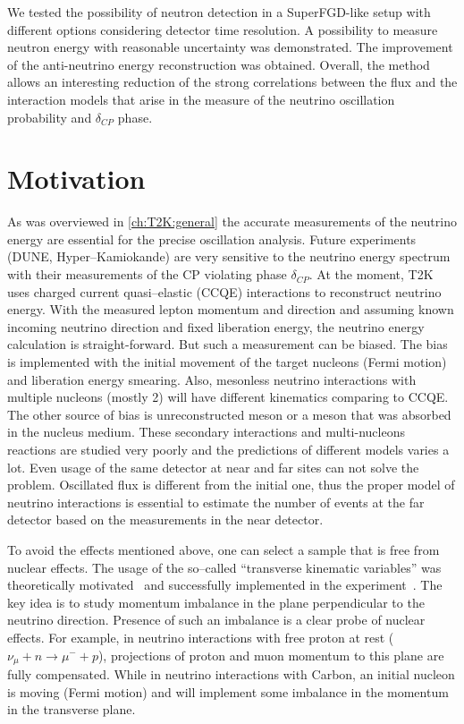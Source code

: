 \documentclass[main.tex]{subfiles}
\begin{document}
We tested the possibility of neutron detection in a SuperFGD-like setup with different options considering detector time resolution. A possibility to measure neutron energy with reasonable uncertainty was demonstrated. The improvement of the anti-neutrino energy reconstruction was obtained. Overall, the method allows an interesting reduction of the strong correlations between the flux and the interaction models that arise in the measure of the neutrino oscillation probability and $\delta_{CP}$ phase.

\section{Motivation}
As was overviewed in \autoref{ch:T2K:general} the accurate measurements of the neutrino energy are essential for the precise oscillation analysis. Future experiments (DUNE, Hyper--Kamiokande) are very sensitive to the neutrino energy spectrum with their measurements of the CP violating phase $\delta_{CP}$. At the moment, T2K uses charged current quasi--elastic (CCQE) interactions to reconstruct neutrino energy. With the measured lepton momentum and direction and assuming known incoming neutrino direction and fixed liberation energy, the neutrino energy calculation is straight-forward. But such a measurement can be biased.
The bias is implemented with the initial movement of the target nucleons (Fermi motion) and liberation energy smearing. Also, mesonless neutrino interactions with multiple nucleons (mostly 2) will have different kinematics comparing to CCQE. The other source of bias is unreconstructed meson or a meson that was absorbed in the nucleus medium. These secondary interactions and multi-nucleons reactions are studied very poorly and the predictions of different models varies a lot. Even usage of the same detector at near and far sites can not solve the problem. Oscillated flux is different from the initial one, thus the proper model of neutrino interactions is essential to estimate the number of events at the far detector based on the measurements in the near detector.

To avoid the effects mentioned above, one can select a sample that is free from nuclear effects. The usage of the so--called ``transverse kinematic variables'' was theoretically motivated~\cite{Lu2016} and successfully implemented in the experiment~\cite{Abe2018d}. The key idea is to study momentum imbalance in the plane perpendicular to the neutrino direction. Presence of such an imbalance is a clear probe of nuclear effects. For example, in neutrino interactions with free proton at rest ($\nu_\mu+n\to\mu^-+p$), projections of proton and muon momentum to this plane are fully compensated. While in neutrino interactions with Carbon, an initial nucleon is moving (Fermi motion) and will implement some imbalance in the momentum in the transverse plane.
\end{document}
